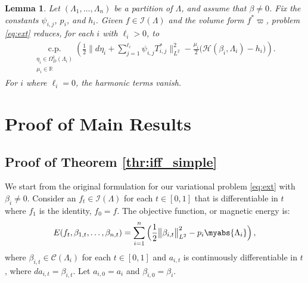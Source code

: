 \documentclass[11pt]{article}
\theoremstyle{plain}
\newtheorem{lemma}[theorem]{Lemma}
\theoremstyle{definition}
\theoremstyle{remark}
\newcommand{\R}{\mathbb{R}}
\newcommand{\ST}{\Lambda}
\newcommand{\C}{\mathcal{C} (\ST_i)}
\newcommand{\I}{\mathcal{I}(\ST)}
\begin{document}
\begin{lemma}\label{Lemma:replace}
    Let \((\ST_1,\dots,\ST_n)\) be a partition of \(\ST\), and assume that \(\beta \neq 0\). Fix the constants \(\psi_{i,j}\), \(p_i\), and \(h_i\). Given \(f \in \I\) and the volume form \(f^*\varpi\), problem \eqref{eq:ext} reduces, for each \(i\) with \(\ell_i>0\), to
    \begin{align}\label{eq:ext_lagrange}
        \underset{\substack{\eta_i \in \Omega^1_D(\ST_i) \\ \mu_i \in \R}}{\mathrm{c.p.}}
        \left(
            \frac{1}{2}\Big\| d\eta_i + \sum_{j=1}^{\ell_i}\psi_{i,j} T_{i,j}^* \Big\|_{L^2}^2
            - \frac{\mu_i}{2}\big(\mathscr{H}(\beta_i,\ST_i)-h_i\big)
        \right).
    \end{align}
    For \(i\) where \(\ell_i=0\), the harmonic terms vanish.
\end{lemma}





\section{Proof of Main Results}\label{section:Main Proofs}




\subsection{Proof of Theorem \ref{thr:iff_simple}}


We start from the original formulation for our variational problem \eqref{eq:ext} with \(\beta_i \neq 0\). Consider an \(f_t \in \I\) for each \(t \in [0,1]\) that is differentiable in \(t\) where \(f_1\) is the identity, \(f_0 = f \). The objective function, or magnetic energy is:
\begin{align*}
    \begin{gathered} 
    E(f_t, \beta_{1,t}, \dots, \beta _{n,t})  =  \sum_{i=1}^n \Big( \frac{1}{2} \big\| \beta_{i,t}\big\|_{L^2}^2 -  p_i \myabs{ \ST_i } \Big) \, , 
    \end{gathered}
\end{align*}
where \( \beta_{i,t} \in \C\) for each \(t \in [0,1]\) and \(a_{i,t}\) is continuously differentiable in \(t\), where \(da_{i,t} = \beta_{i,t}\). Let \(a_{i,0} = a_i\) and \(\beta_{i,0}= \beta _i\). 
\end{document}
